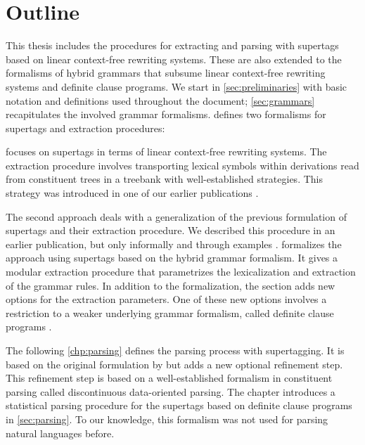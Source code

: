 \documentclass[../document.tex]{subfiles}
\begin{document}
    \section*{Outline}
    This thesis includes the procedures for extracting and parsing with supertags based on linear context-free rewriting systems.
    These are also extended to the formalisms of hybrid grammars that subsume linear context-free rewriting systems and definite clause programs.
    We start in \cref{sec:preliminaries} with basic notation and definitions used throughout the document; \cref{sec:grammars} recapitulates the involved grammar formalisms.
     defines two formalisms for supertags and extraction procedures:
    \begin{compactitem}
        \item {} focuses on supertags in terms of linear context-free rewriting systems.
            The extraction procedure involves transporting lexical symbols within derivations read from constituent trees in a treebank with well-established strategies.
            This strategy was introduced in one of our earlier publications \citep{RupMoe21}.
        \item The second approach deals with a generalization of the previous formulation of supertags and their extraction procedure.
            We described this procedure in an earlier publication, but only informally and through examples \citep{Rup22}.
             formalizes the approach using supertags based on the hybrid grammar formalism.
            It gives a modular extraction procedure that parametrizes the lexicalization and extraction of the grammar rules.
            In addition to the formalization, the section adds new options for the extraction parameters.
            One of these new options involves a restriction to a weaker underlying grammar formalism, called definite clause programs \citep{Der85}.
    \end{compactitem}
    The following \cref{chp:parsing} defines the parsing process with supertagging.
    It is based on the original formulation by \citet{bangalore1999supertagging} but adds a new optional refinement step.
    This refinement step is based on a well-established formalism in constituent parsing called discontinuous data-oriented parsing.
    The chapter introduces a statistical parsing procedure for the supertags based on definite clause programs in \cref{sec:parsing}. To our knowledge, this formalism was not used for parsing natural languages before.
\end{document}

